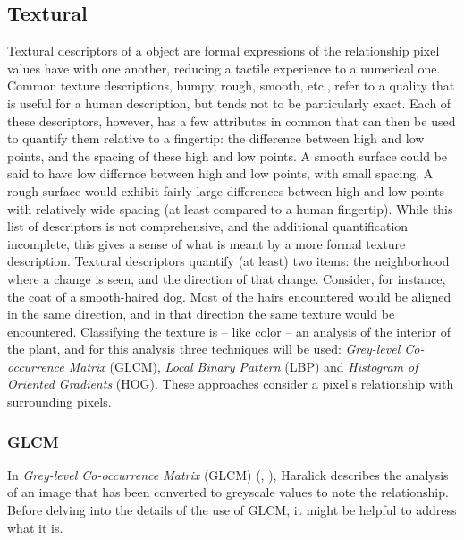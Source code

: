 \documentclass[letterpaper]{article}
\begin{document}
{\subsection{Textural}
Textural descriptors of a object are formal expressions of the relationship pixel values have with one another, reducing a tactile experience to a numerical one. Common texture descriptions, bumpy, rough, smooth, etc., refer to a quality that is useful for a human description, but tends not to be particularly exact. Each of these descriptors, however, has a few attributes in common that can then be used to quantify them relative to a fingertip: the difference between high and low points, and the spacing of these high and low points. A smooth surface could be said to have low differnce between high and low points, with small spacing. A rough surface would exhibit fairly large differences between high and low points with relatively wide spacing (at least compared to a human fingertip). While this list of descriptors is not comprehensive, and the additional quantification incomplete, this gives a sense of what is meant by a more formal texture description. Textural descriptors quantify (at least) two items: the neighborhood where a change is seen, and the direction of that change. Consider, for instance, the coat of a smooth-haired dog. Most of the hairs encountered would be aligned in the same direction, and in that direction the same texture would be encountered.
Classifying the texture is -- like color -- an analysis of the interior of the plant, and for this analysis three techniques will be used:  \textit{Grey-level Co-occurrence Matrix} (GLCM), \textit{Local Binary Pattern} (LBP) and \textit{Histogram of Oriented Gradients} (HOG). These approaches consider a pixel's relationship with surrounding pixels.

\subsubsection{GLCM}
In \textit{Grey-level Co-occurrence Matrix} (GLCM) (\cite{Haralick1973-gr}, \cite{Hall-Beyer2017-nx}), Haralick describes the analysis of an image that has been converted to greyscale values to note the relationship. Before delving into the details of the use of GLCM, it might be helpful to address what it is.

}
\end{document}
